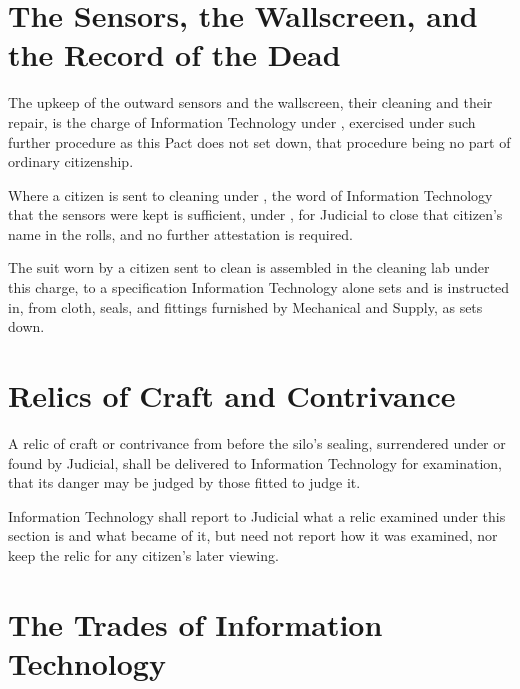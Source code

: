 \section{The Sensors, the Wallscreen, and the Record of the Dead}
\label{sec:it:sensors-the-wallscreen-and-the-record-of-the-dead}

The upkeep of the outward sensors and the wallscreen, their cleaning and their repair, is the charge of Information Technology under , exercised under such further procedure as this Pact does not set down, that procedure being no part of ordinary citizenship.

\begin{clauses}
\item Where a citizen is sent to cleaning under , the word of Information Technology that the sensors were kept is sufficient, under , for Judicial to close that citizen's name in the rolls, and no further attestation is required.
\item The suit worn by a citizen sent to clean is assembled in the cleaning lab under this charge, to a specification Information Technology alone sets and is instructed in, from cloth, seals, and fittings furnished by Mechanical and Supply, as  sets down.
\end{clauses}

\section{Relics of Craft and Contrivance}
\label{sec:it:relics-of-craft-and-contrivance}

A relic of craft or contrivance from before the silo's sealing, surrendered under  or found by Judicial, shall be delivered to Information Technology for examination, that its danger may be judged by those fitted to judge it.

\begin{clauses}
\item Information Technology shall report to Judicial what a relic examined under this section is and what became of it, but need not report how it was examined, nor keep the relic for any citizen's later viewing.
\end{clauses}

\section{The Trades of Information Technology}
\label{sec:it:trades-of-information-technology}

